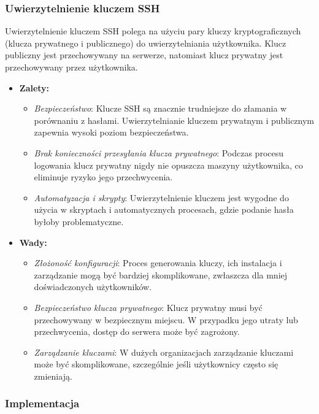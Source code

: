 \documentclass{article}
\begin{document}
\subsubsection{Uwierzytelnienie kluczem SSH}

Uwierzytelnienie kluczem SSH polega na użyciu pary kluczy kryptograficznych (klucza prywatnego i publicznego) do uwierzytelniania użytkownika. Klucz publiczny jest przechowywany na serwerze, natomiast klucz prywatny jest przechowywany przez użytkownika.

\begin{itemize}
    \item \textbf{Zalety:}
    \begin{itemize}
        \item \textit{Bezpieczeństwo}: Klucze SSH są znacznie trudniejsze do złamania w porównaniu z hasłami. Uwierzytelnianie kluczem prywatnym i publicznym zapewnia wysoki poziom bezpieczeństwa.
        \item \textit{Brak konieczności przesyłania klucza prywatnego}: Podczas procesu logowania klucz prywatny nigdy nie opuszcza maszyny użytkownika, co eliminuje ryzyko jego przechwycenia.
        \item \textit{Automatyzacja i skrypty}: Uwierzytelnienie kluczem jest wygodne do użycia w skryptach i automatycznych procesach, gdzie podanie hasła byłoby problematyczne.
    \end{itemize}
    \item \textbf{Wady:}
    \begin{itemize}
        \item \textit{Złożoność konfiguracji}: Proces generowania kluczy, ich instalacja i zarządzanie mogą być bardziej skomplikowane, zwłaszcza dla mniej doświadczonych użytkowników.
        \item \textit{Bezpieczeństwo klucza prywatnego}: Klucz prywatny musi być przechowywany w bezpiecznym miejscu. W przypadku jego utraty lub przechwycenia, dostęp do serwera może być zagrożony.
        \item \textit{Zarządzanie kluczami}: W dużych organizacjach zarządzanie kluczami może być skomplikowane, szczególnie jeśli użytkownicy często się zmieniają.
    \end{itemize}
\end{itemize}

\subsubsection{Implementacja}
\end{document}
